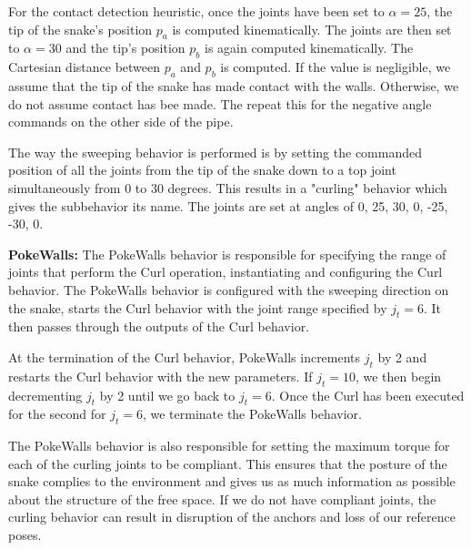 For the contact detection heuristic, once the joints have been set to $\alpha = 25$, the tip of the snake's position $p_a$ is computed kinematically.  The joints are then set to $\alpha = 30$ and the tip's position $p_b$ is again computed kinematically.  The Cartesian distance between $p_a$ and $p_b$ is computed.  If the value is negligible, we assume that the tip of the snake has made contact with the walls.  Otherwise, we do not assume contact has bee made.  The repeat this for the negative angle commands on the other side of the pipe.  

The way the sweeping behavior is performed is by setting the commanded position of all the joints from the tip of the snake down to a top joint simultaneously from 0 to 30 degrees.  This results in a "curling" behavior which gives the subbehavior its name.  The joints are set at angles of 0, 25, 30, 0, -25, -30, 0.



\textbf{PokeWalls:} The PokeWalls behavior is responsible for specifying the range of joints that perform the Curl operation, instantiating and configuring the Curl behavior.  The PokeWalls behavior is configured with the sweeping direction on the snake, starts the Curl behavior with the joint range specified by $j_t = 6$.  It then passes through the outputs of the Curl behavior.

At the termination of the Curl behavior, PokeWalls increments $j_t$ by 2 and restarts the Curl behavior with the new parameters.  If $j_t = 10$, we then begin decrementing $j_t$ by 2 until we go back to $j_t = 6$.  Once the Curl has been executed for the second for $j_t = 6$, we terminate the PokeWalls behavior.

The PokeWalls behavior is also responsible for setting the maximum torque for each of the curling joints to be compliant.  This ensures that the posture of the snake complies to the environment and gives us as much information as possible about the structure of the free space.  If we do not have compliant joints, the curling behavior can result in disruption of the anchors and loss of our reference poses.


